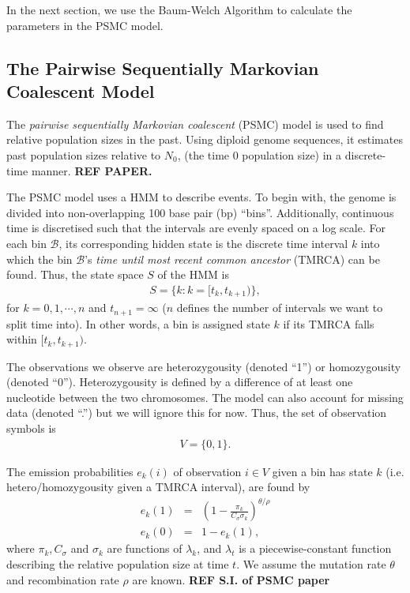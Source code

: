 \documentclass[12pt]{article}
\newcommand{\B}{\mathcal B}
\begin{document}
In the next section, we use the Baum-Welch Algorithm to calculate the parameters in the PSMC model.

\subsection{The Pairwise Sequentially Markovian Coalescent Model}\label{ssec:PSMC}
The \emph{pairwise sequentially Markovian coalescent} (PSMC) model is used to find relative population sizes in the past. Using diploid genome sequences, it estimates past population sizes relative to $N_0$, (the time 0 population size) in a discrete-time manner. \textbf{REF PAPER.}

The PSMC model uses a HMM to describe events. To begin with, the genome is divided into non-overlapping 100 base pair (bp) ``bins''. Additionally, continuous time is discretised such that the intervals are evenly spaced on a log scale. For each bin $\B$, its corresponding hidden state is the discrete time interval $k$ into which the bin $\B$'s \emph{time until most recent common ancestor} (TMRCA) can be found. Thus, the state space $S$ of the HMM is
\begin{eqnarray}
  S= \{k : k=[t_k,t_{k+1}) \},
\end{eqnarray}
for $k=0,1,\cdots,n$ and $t_{n+1}=\infty$ ($n$ defines the number of intervals we want to split time into). In other words, a bin is assigned state $k$ if its TMRCA falls within $[t_k,t_{k+1})$.

  The observations we observe are heterozygousity (denoted ``1'') or homozygousity (denoted ``0''). Heterozygousity is defined by a difference of at least one nucleotide between the two chromosomes. The model can also account for missing data (denoted ``.'') but we will ignore this for now. Thus, the set of observation symbols is
\begin{eqnarray}
  V= \{0,1 \}.
\end{eqnarray}

The emission probabilities $e_k(i)$ of observation $i\in V$ given a bin has state $k$ (i.e. hetero/homozygousity given a TMRCA interval), are found by
\begin{eqnarray}
  e_k(1)&=&\left(1-\frac{\pi_k}{C_\sigma\sigma_k} \right)^{\theta/\rho}\\
  e_k(0)&=&1-e_k(1),
\end{eqnarray}
where $\pi_k, C_\sigma$ and $\sigma_k$ are functions of $\lambda_k$, and $\lambda_t$ is a piecewise-constant function describing the relative population size at time $t$. We assume the mutation rate $\theta$ and recombination rate $\rho$ are known. \textbf{REF S.I. of PSMC paper}
\end{document}
